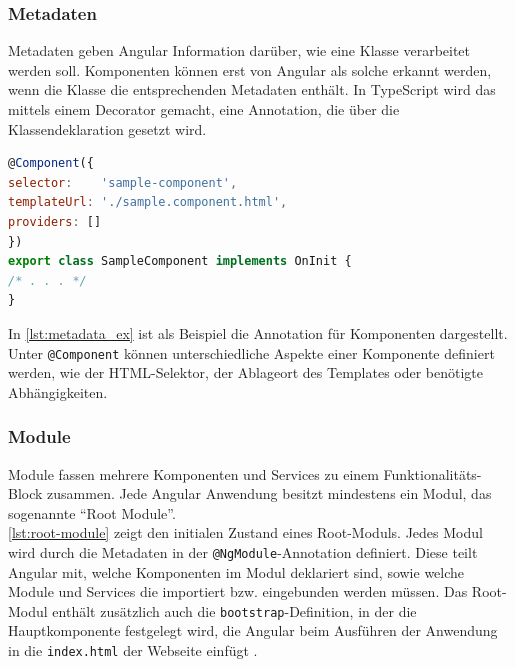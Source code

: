 \subsubsection{Metadaten}
Metadaten geben Angular Information darüber, wie eine Klasse verarbeitet werden soll. Komponenten können erst von Angular als solche erkannt werden, wenn die Klasse die entsprechenden Metadaten enthält.
In TypeScript wird das mittels einem Decorator gemacht, eine Annotation, die über die Klassendeklaration gesetzt wird.
\\
\begin{lstlisting}[language=JavaScript,caption={Beispiel Metadaten-Annotation für Komponenten},label=lst:metadata_ex]
@Component({
selector:    'sample-component',
templateUrl: './sample.component.html',
providers: []
})
export class SampleComponent implements OnInit {
/* . . . */
}
\end{lstlisting}

In \cref{lst:metadata_ex} ist als Beispiel die Annotation für Komponenten dargestellt. Unter \texttt{@Component} können unterschiedliche Aspekte einer Komponente definiert werden, wie der \acs{HTML}-Selektor, der Ablageort des Templates oder benötigte Abhängigkeiten.

\subsubsection{Module}
Module fassen mehrere Komponenten und Services zu einem Funktionalitäts-Block zusammen. Jede Angular Anwendung besitzt mindestens ein Modul, das sogenannte \enquote{Root Module}.
\\


\cref{lst:root-module} zeigt den initialen Zustand eines Root-Moduls. Jedes Modul wird durch die Metadaten in der \texttt{@NgModule}-Annotation definiert.
Diese teilt Angular mit, welche Komponenten im Modul deklariert sind, sowie welche Module und Services die importiert bzw. eingebunden werden müssen.
Das Root-Modul enthält zusätzlich auch die \texttt{bootstrap}-Definition, in der die Hauptkomponente festgelegt wird, die Angular beim Ausführen der Anwendung in die \texttt{index.html} der Webseite einfügt \cite{Angular.io2017a}.

